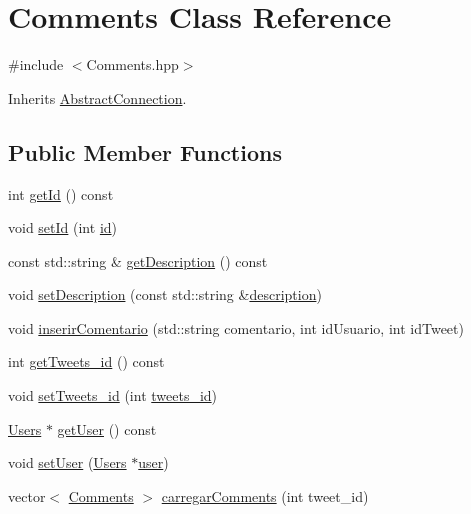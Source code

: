 \hypertarget{class_comments}{}\section{Comments Class Reference}
\label{class_comments}


{\ttfamily \#include $<$Comments.\+hpp$>$}



Inherits \hyperlink{class_abstract_connection}{Abstract\+Connection}.

\subsection*{Public Member Functions}
\begin{DoxyCompactItemize}
\item 
int \hyperlink{class_comments_a5e6142cc7d1af69d82c4f3e237df082b}{get\+Id} () const
\item 
void \hyperlink{class_comments_ac258caa7219cb5a617122ac91656e69b}{set\+Id} (int \hyperlink{class_comments_a62aa986c551ebac090962ab38b3841d6}{id})
\item 
const std\+::string \& \hyperlink{class_comments_a998baa3bb49d969dccbcc646cde03ea8}{get\+Description} () const
\item 
void \hyperlink{class_comments_a422f40e2e51352167d43db4607894566}{set\+Description} (const std\+::string \&\hyperlink{class_comments_ad4073ce0c82aca8455a0ffe4170d03ec}{description})
\item 
void \hyperlink{class_comments_aec43404bd4520072a9e2a934b978a1f4}{inserir\+Comentario} (std\+::string comentario, int id\+Usuario, int id\+Tweet)
\item 
int \hyperlink{class_comments_acc817e8cea26fbd0060cc82ab0dbd50b}{get\+Tweets\+\_\+id} () const
\item 
void \hyperlink{class_comments_a25e18b572d0be1db867985e55b3aaff5}{set\+Tweets\+\_\+id} (int \hyperlink{class_comments_a024beb18bc87f76a1484f9edd4a64678}{tweets\+\_\+id})
\item 
\hyperlink{class_users}{Users} $\ast$ \hyperlink{class_comments_a22549ffe1f558a1cbe9fe2ca8a5917ff}{get\+User} () const
\item 
void \hyperlink{class_comments_a8dd0e3690472525bfd8083b28601bdf4}{set\+User} (\hyperlink{class_users}{Users} $\ast$\hyperlink{class_comments_a8e0c8129a99373132b6a182fc817495f}{user})
\item 
vector$<$ \hyperlink{class_comments}{Comments} $>$ \hyperlink{class_comments_ab7386b4ce9198b167e768c9ca7880a18}{carregar\+Comments} (int tweet\+\_\+id)
\end{DoxyCompactItemize}
